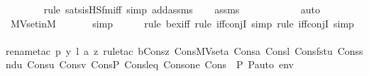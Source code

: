 \begin{isabellebody}
\ \ \ \ \ \ \ \isamarkupfalse%
{\isacharparenleft}{\kern0pt}rule\ sats{\isacharunderscore}{\kern0pt}is{\isacharunderscore}{\kern0pt}HS{\isacharunderscore}{\kern0pt}fm{\isacharunderscore}{\kern0pt}iff{\isacharcomma}{\kern0pt}\ simp\ add{\isacharcolon}{\kern0pt}assms{\isacharparenright}{\kern0pt}\isanewline
\ \ \isamarkupfalse%
\ assms\isanewline
\ \ \ \ \ \ \ \ \ \ \isamarkupfalse%
\ auto{\isacharbrackleft}{\kern0pt}{}{\isacharbrackright}{\kern0pt}\isanewline
\ \ \isamarkupfalse%
\ MVset{\isacharunderscore}{\kern0pt}in{\isacharunderscore}{\kern0pt}M\isanewline
\ \ \ \ \ \isamarkupfalse%
\ simp\isanewline
\ \ \ \ \ \isamarkupfalse%
{\isacharparenleft}{\kern0pt}rule\ bex{\isacharunderscore}{\kern0pt}iff{\isacharcomma}{\kern0pt}\ rule\ iff{\isacharunderscore}{\kern0pt}conjI{}{\isacharcomma}{\kern0pt}\ simp{\isacharcomma}{\kern0pt}\ rule\ iff{\isacharunderscore}{\kern0pt}conjI{}{\isacharcomma}{\kern0pt}\ simp{\isacharparenright}{\kern0pt}\isanewline
\ \ \isamarkupfalse%
{\isacharparenleft}{\kern0pt}rename{\isacharunderscore}{\kern0pt}tac\ p\ y\ l\ a\ z{\isacharcomma}{\kern0pt}\ rule{\isacharunderscore}{\kern0pt}tac\ b{\isacharequal}{\kern0pt}{\isachardoublequoteopen}Cons{\isacharparenleft}{\kern0pt}z{\isacharcomma}{\kern0pt}\ Cons{\isacharparenleft}{\kern0pt}MVset{\isacharparenleft}{\kern0pt}a{\isacharparenright}{\kern0pt}{\isacharcomma}{\kern0pt}\ Cons{\isacharparenleft}{\kern0pt}a{\isacharcomma}{\kern0pt}\ Cons{\isacharparenleft}{\kern0pt}l{\isacharcomma}{\kern0pt}\ Cons{\isacharparenleft}{\kern0pt}fst{\isacharparenleft}{\kern0pt}u{\isacharparenright}{\kern0pt}{\isacharcomma}{\kern0pt}\ Cons{\isacharparenleft}{\kern0pt}snd{\isacharparenleft}{\kern0pt}u{\isacharparenright}{\kern0pt}{\isacharcomma}{\kern0pt}\ Cons{\isacharparenleft}{\kern0pt}u{\isacharcomma}{\kern0pt}\ Cons{\isacharparenleft}{\kern0pt}v{\isacharcomma}{\kern0pt}\ Cons{\isacharparenleft}{\kern0pt}P{\isacharcomma}{\kern0pt}\ Cons{\isacharparenleft}{\kern0pt}leq{\isacharcomma}{\kern0pt}\ Cons{\isacharparenleft}{\kern0pt}one{\isacharcomma}{\kern0pt}\ Cons{\isacharparenleft}{\kern0pt}{\isasymlangle}{\isasymF}{\isacharcomma}{\kern0pt}\ {\isasymG}{\isacharcomma}{\kern0pt}\ P{\isacharcomma}{\kern0pt}\ P{\isacharunderscore}{\kern0pt}auto{\isasymrangle}{\isacharcomma}{\kern0pt}\ env{\isacharparenright}{\kern0pt}{\isacharparenright}{\kern0pt}{\isacharparenright}{\kern0pt}{\isacharparenright}{\kern0pt}{\isacharparenright}{\kern0pt}{\isacharparenright}{\kern0pt}{\isacharparenright}{\kern0pt}{\isacharparenright}{\kern0pt}{\isacharparenright}{\kern0pt}{\isacharparenright}{\kern0pt}{\isacharparenright}{\kern0pt}{\isacharparenright}{\kern0pt}{\isachardoublequoteclose}\ \isanewline

\end{isabellebody}
